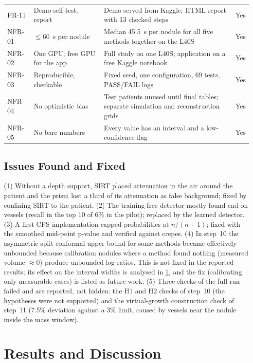 {\begin{longtable}{>{\raggedright\arraybackslash}p{1.4cm} >{\raggedright\arraybackslash}p{4.3cm} >{\raggedright\arraybackslash}p{6.2cm} >{\raggedright\arraybackslash}p{1.3cm}}
FR-11 & Demo self-test; report & Demo served from Kaggle; HTML report with 13 checked steps & Yes \\
NFR-01 & $\leq 60$~s per nodule & Median 45.5~s per nodule for all five methods together on the L40S & Yes \\
NFR-02 & One GPU; free GPU for the app & Full study on one L40S; application on a free Kaggle notebook & Yes \\
NFR-03 & Reproducible, checkable & Fixed seed, one configuration, 69 tests, PASS/FAIL logs & Yes \\
NFR-04 & No optimistic bias & Test patients unused until final tables; separate simulation and reconstruction grids & Yes \\
NFR-05 & No bare numbers & Every value has an interval and a low-confidence flag & Yes \\
\bottomrule
\end{longtable}
}

\subsection{Issues Found and Fixed}
 (1) Without a depth support, SIRT placed attenuation in the air around the patient and the prism lost a third of its attenuation as false background; fixed by confining SIRT to the patient. (2) The training-free detector mostly found end-on vessels (recall in the top 10 of 6\% in the pilot); replaced by the learned detector. (3) A first CPS implementation capped probabilities at $n/(n+1)$; fixed with the smoothed mid-point p-value and verified against crepes. (4) In step~10 the asymmetric split-conformal upper bound for some methods became effectively unbounded because calibration nodules where a method found nothing (measured volume $\approx 0$) produce unbounded log-ratios. This is not fixed in the reported results; its effect on the interval widths is analysed in \cref{sec:resultsdisc}, and the fix (calibrating only measurable cases) is listed as future work. (5) Three checks of the full run failed and are reported, not hidden: the H1 and H2 checks of step~10 (the hypotheses were not supported) and the virtual-growth construction check of step~11 (7.5\% deviation against a 3\% limit, caused by vessels near the nodule inside the mass window).

\section{Results and Discussion}
\label{sec:resultsdisc}

